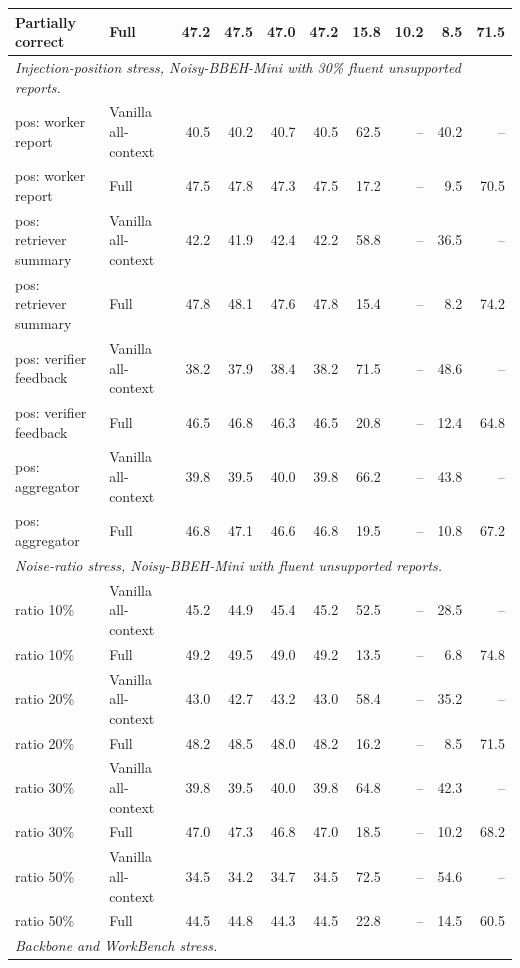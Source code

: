 \begin{longtable}{llrrrrrrrr}
\rowcolor{tracesoft}
Partially correct & \method{} Full & 47.2 & 47.5 & 47.0 & 47.2 & 15.8 & 10.2 & 8.5 & 71.5 \\
\midrule
\multicolumn{10}{l}{\emph{Injection-position stress, Noisy-BBEH-Mini with 30\% fluent unsupported reports.}} \\
pos: worker report & Vanilla all-context & 40.5 & 40.2 & 40.7 & 40.5 & 62.5 & -- & 40.2 & -- \\
pos: worker report & \method{} Full & 47.5 & 47.8 & 47.3 & 47.5 & 17.2 & -- & 9.5 & 70.5 \\
pos: retriever summary & Vanilla all-context & 42.2 & 41.9 & 42.4 & 42.2 & 58.8 & -- & 36.5 & -- \\
pos: retriever summary & \method{} Full & 47.8 & 48.1 & 47.6 & 47.8 & 15.4 & -- & 8.2 & 74.2 \\
pos: verifier feedback & Vanilla all-context & 38.2 & 37.9 & 38.4 & 38.2 & 71.5 & -- & 48.6 & -- \\
pos: verifier feedback & \method{} Full & 46.5 & 46.8 & 46.3 & 46.5 & 20.8 & -- & 12.4 & 64.8 \\
pos: aggregator & Vanilla all-context & 39.8 & 39.5 & 40.0 & 39.8 & 66.2 & -- & 43.8 & -- \\
pos: aggregator & \method{} Full & 46.8 & 47.1 & 46.6 & 46.8 & 19.5 & -- & 10.8 & 67.2 \\
\midrule
\multicolumn{10}{l}{\emph{Noise-ratio stress, Noisy-BBEH-Mini with fluent unsupported reports.}} \\
ratio 10\% & Vanilla all-context & 45.2 & 44.9 & 45.4 & 45.2 & 52.5 & -- & 28.5 & -- \\
ratio 10\% & \method{} Full & 49.2 & 49.5 & 49.0 & 49.2 & 13.5 & -- & 6.8 & 74.8 \\
ratio 20\% & Vanilla all-context & 43.0 & 42.7 & 43.2 & 43.0 & 58.4 & -- & 35.2 & -- \\
ratio 20\% & \method{} Full & 48.2 & 48.5 & 48.0 & 48.2 & 16.2 & -- & 8.5 & 71.5 \\
ratio 30\% & Vanilla all-context & 39.8 & 39.5 & 40.0 & 39.8 & 64.8 & -- & 42.3 & -- \\
ratio 30\% & \method{} Full & 47.0 & 47.3 & 46.8 & 47.0 & 18.5 & -- & 10.2 & 68.2 \\
ratio 50\% & Vanilla all-context & 34.5 & 34.2 & 34.7 & 34.5 & 72.5 & -- & 54.6 & -- \\
ratio 50\% & \method{} Full & 44.5 & 44.8 & 44.3 & 44.5 & 22.8 & -- & 14.5 & 60.5 \\
\midrule
\multicolumn{10}{l}{\emph{Backbone and WorkBench stress.}} \\

\end{longtable}
